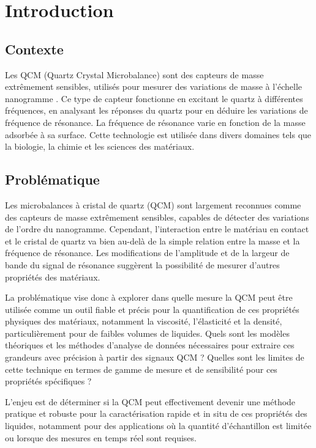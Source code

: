 \chapter{Introduction}

\section{Contexte}

Les QCM (Quartz Crystal Microbalance) sont des capteurs de masse extrêmement sensibles,
utilisés pour mesurer des variations de masse à l'échelle nanogramme \cite{WANG2024109967}.
Ce type de capteur fonctionne en excitant le quartz à différentes fréquences,
en analysant les réponses du quartz pour en déduire les variations de fréquence de résonance.
La fréquence de résonance varie en fonction de la masse adsorbée à sa surface.
Cette technologie est utilisée dans divers domaines tels que la biologie,
la chimie et les sciences des matériaux.

\section{Problématique}
Les microbalances à cristal de quartz (QCM) sont largement reconnues comme des capteurs de masse extrêmement sensibles, 
capables de détecter des variations de l'ordre du nanogramme. Cependant, 
l'interaction entre le matériau en contact et le cristal de quartz va bien au-delà de la simple relation entre la masse et la fréquence de résonance. 
Les modifications de l'amplitude et de la largeur de bande du signal de résonance suggèrent la possibilité de mesurer d'autres propriétés des matériaux.

La problématique vise donc à explorer dans quelle mesure la QCM peut être utilisée comme un outil fiable et précis pour la quantification de ces propriétés physiques des matériaux, 
notamment la viscosité, l'élasticité et la densité, 
particulièrement pour de faibles volumes de liquides. 
Quels sont les modèles théoriques et les méthodes d'analyse de données nécessaires pour extraire ces grandeurs avec précision à partir des signaux QCM ? 
Quelles sont les limites de cette technique en termes de gamme de mesure et de sensibilité pour ces propriétés spécifiques ?

L'enjeu est de déterminer si la QCM peut effectivement devenir une méthode pratique et robuste pour la caractérisation rapide et in situ de ces propriétés des liquides, 
notamment pour des applications où la quantité d'échantillon est limitée ou lorsque des mesures en temps réel sont requises.

